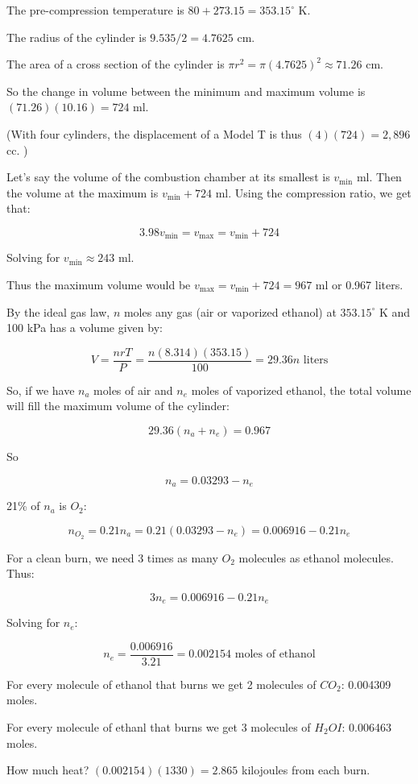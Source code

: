\begin{Answer}[ref=fuelmix] 

The pre-compression temperature is $80 + 273.15 = 353.15^\circ$ K.

The radius of the cylinder is $9.535/2 =4.7625$ cm.

The area of a cross section of the cylinder is $\pi r^2 = \pi (4.7625)^2 \approx 71.26$ cm.

So the change in volume between the minimum and maximum volume is $ (71.26)(10.16) = 724$ ml.

(With four cylinders,  the displacement of a Model T is thus $ (4)(724) = 2,896$ cc. )

Let's say the volume of the combustion chamber at its smallest is $v_{\text{min}}$ ml.   Then the volume at the maximum is $v_{\text{min}} +724$ ml.  Using the compression ratio,  we get that:

$$3.98v_{\text{min}} = v_{\text{max}} = v_{\text{min}} + 724$$

Solving for $v_{\text{min}} \approx 243$ ml.

Thus the maximum volume would be $v_{\text{max}} = v_{\text{min}} + 724 = 967$ ml or 0.967 liters.

By the ideal gas law,  $n$ moles any gas (air or vaporized ethanol) at  $353.15^\circ$ K and 100 kPa has a volume given by:

$$V = \frac{n r T}{P} = \frac{n (8.314)(353.15)}{100} = 29.36 n\text{ liters}$$ 

So, if we have $n_a$ moles of air and $n_e$ moles of vaporized ethanol,  the total volume will fill the maximum volume of the cylinder:

$$29.36 (n_a + n_e) = 0.967$$

So

$$n_a = 0.03293 -  n_e$$

21\% of $n_a$ is $O_2$:

$$n_{O_2} = 0.21 n_a = 0.21 (0.03293 -  n_e) = 0.006916 - 0.21 n_e$$

For a clean burn,  we need 3 times as many $O_2$ molecules as ethanol molecules.  Thus:

$$3 n_e  =   0.006916 - 0.21 n_e$$

Solving for $n_e$:

$$n_e = \frac{0.006916}{3.21}  = 0.002154 \text{ moles  of ethanol}$$

For every molecule of ethanol that burns we get 2 molecules of $CO_2$: 0.004309 moles.

For every molecule of ethanl that burns we get 3 molecules of $H_2OI$: 0.006463 moles.

How much heat?  $(0.002154)(1330) =  2.865$ kilojoules from each burn.

\end{Answer}


